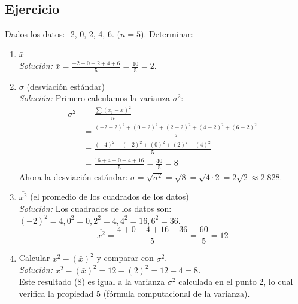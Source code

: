 \documentclass[12pt, letterpaper]{article}
\begin{document}
\subsection{Ejercicio}
Dados los datos: -2, 0, 2, 4, 6. ($n=5$). Determinar:
\begin{enumerate}
	\item \texorpdfstring{$\bar{x}$}{x barra} \\
	      \textit{Solución:} $\bar{x} = \frac{-2+0+2+4+6}{5} = \frac{10}{5} = 2$. \\
	\item \texorpdfstring{$\sigma$ (desviación estándar)}{sigma (desviación estándar)} \\
	      \textit{Solución:} Primero calculamos la varianza $\sigma^2$:
	      \begin{align*} \sigma^2 &= \frac{\sum (x_i - \bar{x})^2}{n} \\ &= \frac{(-2-2)^2+(0-2)^2+(2-2)^2+(4-2)^2+(6-2)^2}{5} \\ &= \frac{(-4)^2+(-2)^2+(0)^2+(2)^2+(4)^2}{5} \\ &= \frac{16+4+0+4+16}{5} = \frac{40}{5} = 8 \end{align*}
	      Ahora la desviación estándar: $\sigma = \sqrt{\sigma^2} = \sqrt{8} = \sqrt{4 \cdot 2} = 2\sqrt{2} \approx 2.828$. \\
	\item \texorpdfstring{$\overline{x^2}$ (el promedio de los cuadrados de los datos)}{x-cuadrado barra (el promedio...)} \\
	      \textit{Solución:} Los cuadrados de los datos son: $(-2)^2=4, 0^2=0, 2^2=4, 4^2=16, 6^2=36$.
	      \[ \overline{x^2} = \frac{4+0+4+16+36}{5} = \frac{60}{5} = 12 \]
	\item \texorpdfstring{Calcular $\overline{x^2}-(\bar{x})^2$ y comparar con $\sigma^2$}{Calcular x-cuadrado-barra - (x-barra)-cuadrado y comparar con sigma-cuadrado}. \\
	      \textit{Solución:} $\overline{x^2}-(\bar{x})^2 = 12 - (2)^2 = 12 - 4 = 8$. \\
	      Este resultado (8) es igual a la varianza $\sigma^2$ calculada en el punto 2, lo cual verifica la propiedad 5 (fórmula computacional de la varianza).
\end{enumerate}
\newpage
\end{document}
